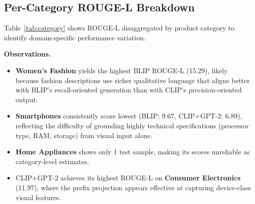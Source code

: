 \documentclass[12pt,a4paper]{article}
\begin{document}
\subsection{Per-Category ROUGE-L Breakdown}

Table~\ref{tab:category} shows ROUGE-L disaggregated by product category to identify
domain-specific performance variation.

\begin{table}[H]
\centering
\caption{Per-category ROUGE-L on the test set. $n$ = number of test samples per category.}
\label{tab:category}
\end{table}

\textbf{Observations.}
\begin{itemize}[noitemsep]
  \item \textbf{Women's Fashion} yields the highest BLIP ROUGE-L (15.29), likely
        because fashion descriptions use richer qualitative language that aligns
        better with BLIP's recall-oriented generation than with CLIP's precision-oriented
        output.
  \item \textbf{Smartphones} consistently score lowest (BLIP: 9.67, CLIP+GPT-2: 6.89),
        reflecting the difficulty of grounding highly technical specifications
        (processor type, RAM, storage) from visual input alone.
  \item \textbf{Home Appliances} shows only 1 test sample, making its scores
        unreliable as category-level estimates.
  \item CLIP+GPT-2 achieves its highest ROUGE-L on \textbf{Consumer Electronics}
        (11.97), where the prefix projection appears effective at capturing
        device-class visual features.
\end{itemize}
\end{document}
